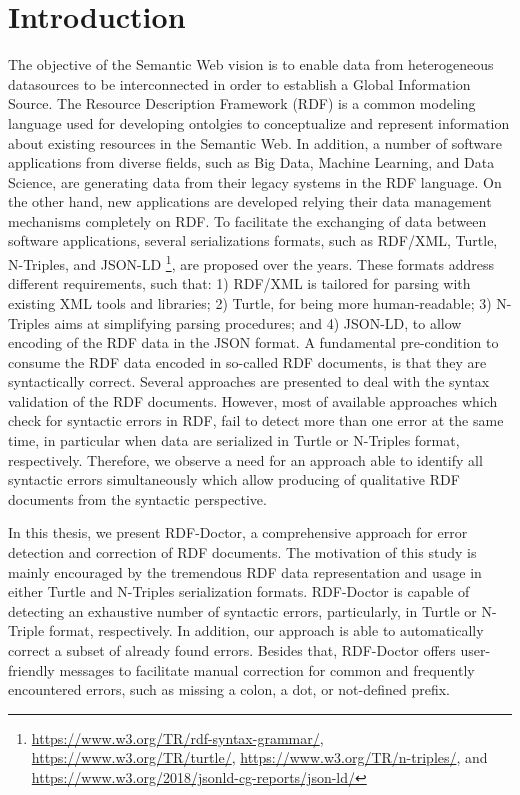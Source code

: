 \chapter{Introduction}
\label{ch:introduction}

\par 
The objective of the Semantic Web vision is to enable data from heterogeneous datasources to be interconnected in order to establish a Global Information Source. 
The Resource Description Framework (RDF) is a common modeling language used for developing ontolgies to conceptualize and represent information about existing resources in the Semantic Web.
In addition, a number of software applications from diverse fields, such as Big Data, Machine Learning, and Data Science, are generating data from their legacy systems in the RDF language. 
On the other hand, new applications are developed relying their data management mechanisms completely on RDF.
To facilitate the exchanging of data between software applications, several serializations formats, such as RDF{/}XML, Turtle, N-Triples, and JSON-LD \footnote{\url{https://www.w3.org/TR/rdf-syntax-grammar/}, \url{https://www.w3.org/TR/turtle/}, \url{https://www.w3.org/TR/n-triples/}, and \url{https://www.w3.org/2018/jsonld-cg-reports/json-ld/}}, are proposed over the years.
These formats address different requirements, such that: 1) RDF{/}XML is tailored for parsing with existing XML tools and libraries; 2) Turtle, for being more human-readable; 3) N-Triples aims at simplifying parsing procedures; and 4) JSON-LD, to allow encoding of the RDF data in the JSON format.
A fundamental pre-condition to consume the RDF data encoded in so-called RDF documents, is that they are syntactically correct.
Several approaches are presented to deal with the syntax validation of the RDF documents.
However, most of available approaches which check for syntactic errors in RDF, fail to detect more than one error at the same time, in particular when data are serialized in Turtle or N-Triples format, respectively. 
Therefore, we observe a need for an approach able to identify all syntactic errors simultaneously which allow producing of qualitative RDF documents from the syntactic perspective.

In this thesis, we present RDF-Doctor, a comprehensive approach for error detection and correction of RDF documents.
The motivation of this study is mainly encouraged by the  tremendous RDF data representation and usage in either Turtle and N-Triples serialization formats.
RDF-Doctor is capable of detecting an exhaustive number of syntactic errors, particularly, in Turtle or N-Triple format, respectively. 
In addition, our approach is able to automatically correct a subset of already found errors.
Besides that, RDF-Doctor offers user-friendly messages to facilitate manual correction for common and frequently encountered errors, such as missing a colon, a dot, or not-defined prefix.  


